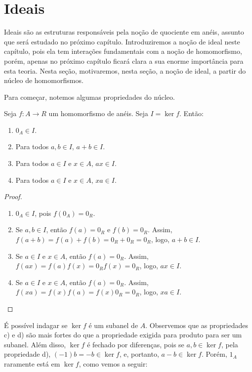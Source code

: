 \section{Ideais}
Ideais são as estruturas responsáveis pela noção de quociente em anéis, assunto que será estudado no próximo capítulo.
Introduziremos a noção de ideal neste capítulo, pois ela tem interações fundamentais com a noção de homomorfismo, porém, apenas no próximo capítulo ficará clara a sua enorme importância para esta teoria.
Nesta seção, motivaremos, nesta seção, a noção de ideal, a partir do núcleo de homomorfismos.

Para começar, notemos algumas propriedades do núcleo.

\begin{prop}
Seja $f:A\rightarrow R$ um homomorfismo de anéis. Seja $I=\ker f$. Então:

\begin{enumerate}[label=\alph*)]
    \item $0_A \in I$.
    \item Para todos $a, b \in I$, $a+b \in I$.
    \item Para todos $a \in I$ e $x \in A$, $ax \in I$.
    \item Para todos $a \in I$ e $x \in A$, $xa \in I$.
\end{enumerate}
\end{prop}

\begin{proof}
    \begin{enumerate}[label=\alph*)]
        \item $0_A \in I$, pois $f(0_A)=0_R$.
        \item Se $a, b \in I$, então $f(a)=0_R$ e $f(b)=0_R$. Assim, $f(a+b)=f(a)+f(b)=0_R+0_R=0_R$, logo, $a+b\in I$.
        \item Se $a \in I$ e $x \in A$, então $f(a)=0_R$. Assim, $f(ax)=f(a)f(x)=0_Rf(x)=0_R$, logo, $ax\in I$.
        \item Se $a \in I$ e $x \in A$, então $f(a)=0_R$. Assim, $f(xa)=f(x)f(a)=f(x)0_R=0_R$, logo, $xa\in I$.
    \end{enumerate}
\end{proof}

É possível indagar se $\ker f$ é um subanel de $A$. Observemos que as propriedades c) e d) são mais fortes do que a propriedade exigida para produto para ser um subanel. Além disso, $\ker f$ é fechado por diferenças, pois se $a, b \in \ker f$, pela propriedade d), $(-1)b=-b\in \ker f$, e, portanto, $a-b \in \ker f$. Porém, $1_A$ raramente está em $\ker f$, como vemos a seguir:

